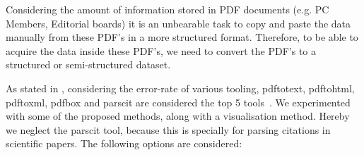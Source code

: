 \documentclass{ou-report}
\begin{document}
Considering the amount of information stored in PDF documents (e.g. PC Members, 
Editorial boards) it is an unbearable task to 
copy and paste the data manually from these PDF's in a more structured format.
Therefore, to be able to acquire the data inside these PDF's, we need to convert 
the PDF's to a structured or semi-structured dataset.

As stated in , considering the error-rate of various 
tooling, pdftotext, pdftohtml, pdftoxml, pdfbox and parscit are considered the 
top 5 tools~\cite{BK2017}. We experimented with some of the proposed methods, 
along with a visualisation method. Hereby we neglect the parscit tool, because 
this is specially for parsing citations in scientific papers.
The following options are considered:
\end{document}
